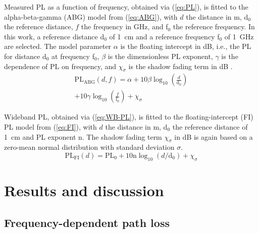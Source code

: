\documentclass[preprint]{rsl}
\begin{document}
Measured PL as a function of frequency, obtained via (\ref{eq:PL}), is fitted to the alpha-beta-gamma (ABG) model from (\ref{eq:ABG}), with $d$ the distance in m, d$_0$ the reference distance, $f$ the frequency in GHz, and f$_0$ the reference frequency.  
In this work, a reference distance d$_0$ of 1~cm and a reference frequency f$_0$ of 1~GHz are selected.
The model parameter $\alpha$ is the floating intercept in dB, i.e., the PL for distance d$_0$ at frequency f$_0$, $\beta$ is the dimensionless PL exponent, $\gamma$ is the dependence of PL on frequency, and $\chi_{\sigma}$ is the shadow fading term in dB \cite{Salous2020}. 
\begin{multline}
  \text{PL}_{\text{ABG}}(d,f) = \alpha + 10 \beta \log_{10}\left(\frac{d}{\text{d}_0}\right) \\ + 10 \gamma \log_{10}\left(\frac{f}{ \text{f}_0}\right) + \chi_{\sigma}
  \label{eq:ABG}
\end{multline}

Wideband PL, obtained via (\ref{eq:WB-PL}), is fitted to the floating-intercept (FI) PL model from (\ref{eq:FI}), with $d$ the distance in m, d$_0$ the reference distance of 1~cm and PL exponent n. 
The shadow fading term $\chi_\sigma$ in dB is again based on a zero-mean normal distribution with standard deviation $\sigma$. 
\begin{equation}
  \text{PL}_{\text{FI}}(d) = \text{PL}_0 + 10 \text{n} \log_{10} (d/\text{d}_0) + \chi_\sigma
  \label{eq:FI}
\end{equation}

\section{Results and discussion\label{sect:results}}

\subsection{Frequency-dependent path loss}
\end{document}
